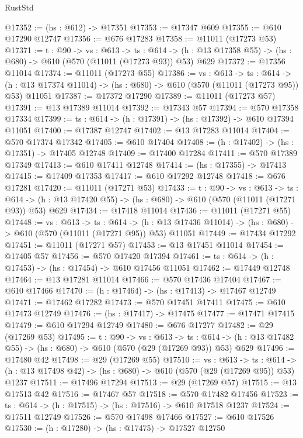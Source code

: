 \begin{lexlean}{RustStd}
\begin{coremodule}
@17352 := (hs : @612) -> @17351
@17353 := @17347 @609
@17355 := @610 @17290 @12747
@17356 := @676 @17283
@17358 := @11011 (@17273 @53)
@17371 := {t : @90} ->
  {vs : @613} ->
  {ts : @614} -> (h : @13 @17358 @55) -> (hs : @680) -> @610 (@570 (@11011 (@17273 @93)) @53) @629
@17372 := @17356 @11014
@17374 := @11011 (@17273 @55)
@17386 := {vs : @613} ->
  {ts : @614} ->
  (h : @13 @17374 @11014) -> (hs : @680) -> @610 (@570 (@11011 (@17273 @95)) @53) @11051
@17387 := @17372 @17290
@17389 := @11011 (@17273 @57)
@17391 := @13 @17389 @11014
@17392 := @17343 @57
@17394 := @570 @17358 @17334
@17399 := {ts : @614} -> (h : @17391) -> (hs : @17392) -> @610 @17394 @11051
@17400 := @17387 @12747
@17402 := @13 @17283 @11014
@17404 := @570 @17374 @17342
@17405 := @610 @17404
@17408 := (h : @17402) -> (hs : @17351) -> @17405 @12748
@17409 := @17400 @17284
@17411 := @570 @17389 @17349
@17413 := @610 @17411 @12748
@17414 := (hs : @17355) -> @17413
@17415 := @17409 @17353
@17417 := @610 @17292 @12748
@17418 := @676 @17281
@17420 := @11011 (@17271 @53)
@17433 := {t : @90} ->
  {vs : @613} ->
  {ts : @614} -> (h : @13 @17420 @55) -> (hs : @680) -> @610 (@570 (@11011 (@17271 @93)) @53) @629
@17434 := @17418 @11014
@17436 := @11011 (@17271 @55)
@17448 := {vs : @613} ->
  {ts : @614} ->
  (h : @13 @17436 @11014) -> (hs : @680) -> @610 (@570 (@11011 (@17271 @95)) @53) @11051
@17449 := @17434 @17292
@17451 := @11011 (@17271 @57)
@17453 := @13 @17451 @11014
@17454 := @17405 @57
@17456 := @570 @17420 @17394
@17461 := {ts : @614} -> (h : @17453) -> (hs : @17454) -> @610 @17456 @11051
@17462 := @17449 @12748
@17464 := @13 @17281 @11014
@17466 := @570 @17436 @17404
@17467 := @610 @17466
@17470 := (h : @17464) -> (hs : @17413) -> @17467 @12749
@17471 := @17462 @17282
@17473 := @570 @17451 @17411
@17475 := @610 @17473 @12749
@17476 := (hs : @17417) -> @17475
@17477 := @17471 @17415
@17479 := @610 @17294 @12749
@17480 := @676 @17277
@17482 := @29 (@17269 @53)
@17495 := {t : @90} ->
  {vs : @613} ->
  {ts : @614} -> (h : @13 @17482 @55) -> (hs : @680) -> @610 (@570 (@29 (@17269 @93)) @53) @629
@17496 := @17480 @42
@17498 := @29 (@17269 @55)
@17510 := {vs : @613} ->
  {ts : @614} -> (h : @13 @17498 @42) -> (hs : @680) -> @610 (@570 (@29 (@17269 @95)) @53) @1237
@17511 := @17496 @17294
@17513 := @29 (@17269 @57)
@17515 := @13 @17513 @42
@17516 := @17467 @57
@17518 := @570 @17482 @17456
@17523 := {ts : @614} -> (h : @17515) -> (hs : @17516) -> @610 @17518 @1237
@17524 := @17511 @12749
@17526 := @570 @17498 @17466
@17527 := @610 @17526
@17530 := (h : @17280) -> (hs : @17475) -> @17527 @12750

\end{coremodule}
\end{lexlean}
